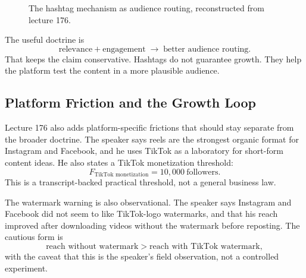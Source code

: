 \documentclass[11pt,oneside]{book}
\begin{document}
\begin{figure}
\centering
{}
\caption{The hashtag mechanism as audience routing, reconstructed from lecture 176.}
\end{figure}

The useful doctrine is
\[
\text{relevance}+\text{engagement}
\;\longrightarrow\;
\text{better audience routing}.
\]
That keeps the claim conservative. Hashtags do not guarantee growth. They help the platform test the content in a more plausible audience.

\subsection{Platform Friction and the Growth Loop}

Lecture 176 also adds platform-specific frictions that should stay separate from the broader doctrine. The speaker says reels are the strongest organic format for Instagram and Facebook, and he uses TikTok as a laboratory for short-form content ideas. He also states a TikTok monetization threshold:
\[
F_{\text{TikTok monetization}}=10{,}000\ \text{followers}.
\]
This is a transcript-backed practical threshold, not a general business law.

The watermark warning is also observational. The speaker says Instagram and Facebook did not seem to like TikTok-logo watermarks, and that his reach improved after downloading videos without the watermark before reposting. The cautious form is
\[
\text{reach without watermark}
>
\text{reach with TikTok watermark},
\]
with the caveat that this is the speaker's field observation, not a controlled experiment.
\end{document}

